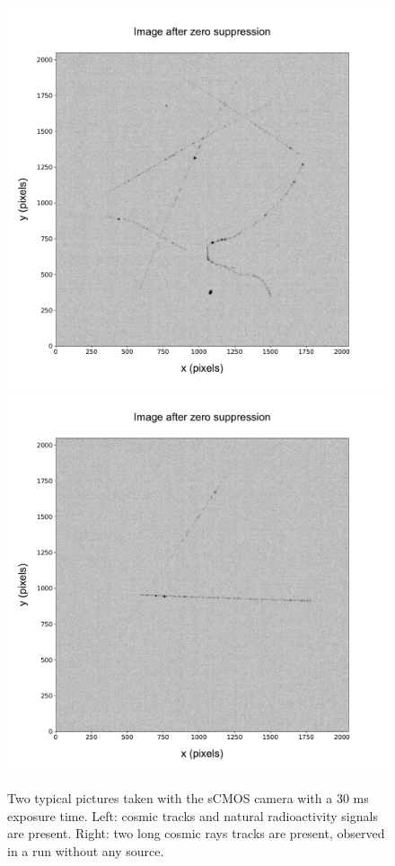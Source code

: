 \documentclass[12pt]{iopart}
\begin{document}
 
\begin{figure}[ht]
  \begin{center}
    \includegraphics[width=0.49\linewidth]{figures/pic_run02317_ev8_oriIma_paper}
    \includegraphics[width=0.49\linewidth]{figures/pic_run02156_ev527_oriIma_paper}
    \caption{Two typical pictures taken with the sCMOS camera with a 30
      ms exposure time. Left: cosmic tracks and natural radioactivity
      signals are present. Right: two long cosmic rays tracks are
      present, observed in a run without any source.
      \label{fig:typicalimage1}}
  \end{center}
\end{figure}
\end{document}
